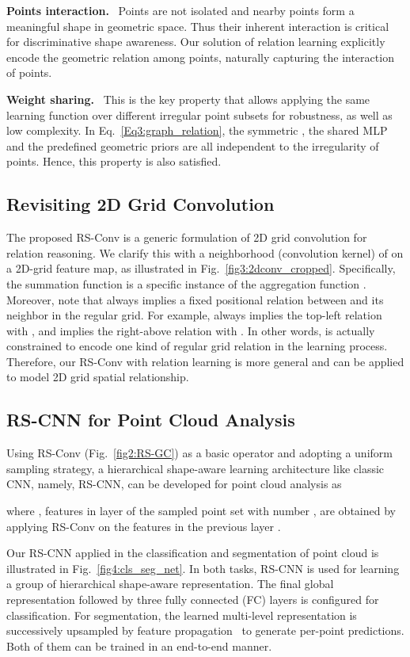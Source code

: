 \documentclass[10pt,twocolumn,letterpaper]{article}
\begin{document}
\vspace{6pt}
\noindent \textbf{Points interaction.}\,\,~Points are not isolated and nearby points form a meaningful shape in geometric space. Thus their inherent interaction is critical for discriminative shape awareness. Our solution of relation learning explicitly encode the geometric relation among points, naturally capturing the interaction of points.

\vspace{6pt}
\noindent \textbf{Weight sharing.}\,\,~This is the key property that allows applying the same learning function over different irregular point subsets for robustness, as well as low complexity. In Eq.~\eqref{Eq3:graph_relation}, the symmetric , the shared MLP  and the predefined geometric priors  are all independent to the irregularity of points. Hence, this property is also satisfied.

\subsection{Revisiting 2D Grid Convolution}
The proposed RS-Conv is a generic formulation of 2D grid convolution for relation reasoning. We clarify this with a neighborhood (convolution kernel) of  on a 2D-grid feature map, as illustrated in Fig.~\ref{fig3:2dconv_cropped}. Specifically, the summation function  is a specific instance of the aggregation function . Moreover, note that  always implies a fixed positional relation between  and its neighbor  in the regular grid. For example,  always implies the top-left relation with , and  implies the right-above relation with . In other words,  is actually constrained to encode one kind of regular grid relation in the learning process. Therefore, our RS-Conv with relation learning is more general and can be applied to model 2D grid spatial relationship.

\subsection{RS-CNN for Point Cloud Analysis}
Using RS-Conv (Fig.~\ref{fig2:RS-GC}) as a basic operator and adopting a uniform sampling strategy, a hierarchical shape-aware learning architecture like classic CNN, namely, RS-CNN, can be developed for point cloud analysis as

where , features in layer  of the sampled point set  with number , are obtained by applying RS-Conv on the features in the previous layer .

Our RS-CNN applied in the classification and segmentation of point cloud is illustrated in Fig.~\ref{fig4:cls_seg_net}. In both tasks, RS-CNN is used for learning a group of hierarchical shape-aware representation. The final global representation followed by three fully connected (FC) layers is configured for classification. For segmentation, the learned multi-level representation is successively upsampled by feature propagation~\cite{c2_pointnet2} to generate per-point predictions. Both of them can be trained in an end-to-end manner.
\end{document}
